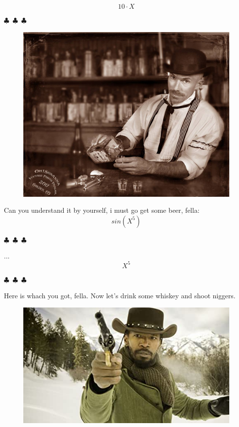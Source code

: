 \documentclass{article}
\begin{document}
\begin{equation}
{{10}\cdot{X}}
\end{equation}
\begin{center} $\clubsuit$~$\clubsuit$~$\clubsuit$ \end{center}\begin{figure}[H] \includegraphics[scale=0.3]{funny_pics/bartender.jpg} \end{figure}Can you understand it by yourself, i must go get some beer, fella:
\begin{equation}
{sin{({{X}^{5}})}}
\end{equation}
\begin{center} $\clubsuit$~$\clubsuit$~$\clubsuit$ \end{center}...
\begin{equation}
{{X}^{5}}
\end{equation}
\begin{center} $\clubsuit$~$\clubsuit$~$\clubsuit$ \end{center}Here is whach you got, fella. Now let's drink some whiskey and shoot niggers.\begin{figure}[H] \includegraphics[scale=0.6]{funny_pics/slave.jpg} \end{figure}
\end{document}
